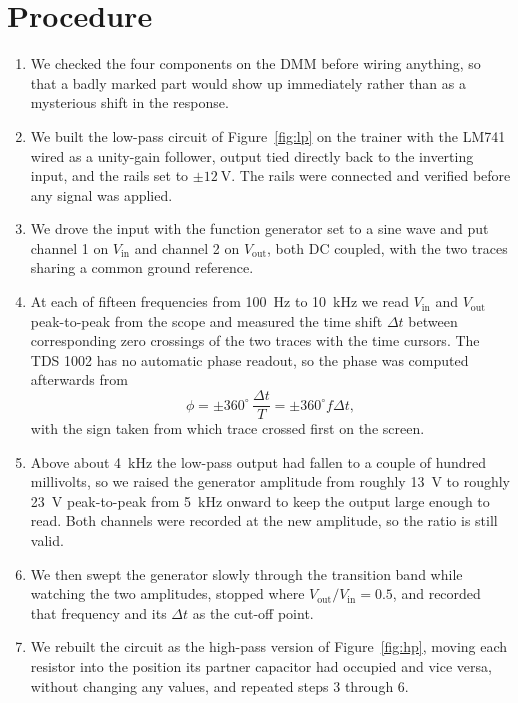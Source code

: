 \documentclass[11pt]{article}
\begin{document}
\section*{Procedure}
\begin{enumerate}[leftmargin=*]
    \item We checked the four components on the DMM before wiring anything, so
    that a badly marked part would show up immediately rather than as a
    mysterious shift in the response.

    \item We built the low-pass circuit of Figure~\ref{fig:lp} on the trainer
    with the LM741 wired as a unity-gain follower, output tied directly back to
    the inverting input, and the rails set to $\pm\qty{12}{\volt}$. The rails were
    connected and verified before any signal was applied.

    \item We drove the input with the function generator set to a sine wave and
    put channel 1 on $V_{\text{in}}$ and channel 2 on $V_{\text{out}}$, both DC
    coupled, with the two traces sharing a common ground reference.

    \item At each of fifteen frequencies from \qty{100}{\hertz} to
    \qty{10}{\kilo\hertz} we read $V_{\text{in}}$ and $V_{\text{out}}$
    peak-to-peak from the scope and measured the time shift $\Delta t$ between
    corresponding zero crossings of the two traces with the time cursors. The
    TDS 1002 has no automatic phase readout, so the phase was computed afterwards
    from
    \[
        \phi = \pm 360^{\circ}\,\frac{\Delta t}{T} = \pm 360^{\circ} f \Delta t,
    \]
    with the sign taken from which trace crossed first on the screen.

    \item Above about \qty{4}{\kilo\hertz} the low-pass output had fallen to a
    couple of hundred millivolts, so we raised the generator amplitude from
    roughly \qty{13}{\volt} to roughly \qty{23}{\volt} peak-to-peak from
    \qty{5}{\kilo\hertz} onward to keep the output large enough to read. Both
    channels were recorded at the new amplitude, so the ratio is still valid.

    \item We then swept the generator slowly through the transition band while
    watching the two amplitudes, stopped where $V_{\text{out}}/V_{\text{in}} =
    0.5$, and recorded that frequency and its $\Delta t$ as the cut-off point.

    \item We rebuilt the circuit as the high-pass version of
    Figure~\ref{fig:hp}, moving each resistor into the position its partner
    capacitor had occupied and vice versa, without changing any values, and
    repeated steps 3 through 6.
\end{enumerate}
\end{document}
